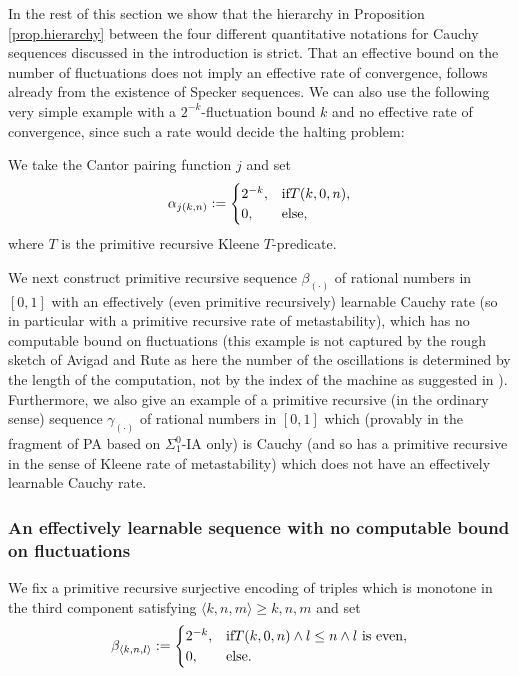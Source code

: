 In the rest of this section we show that the hierarchy in Proposition \ref{prop.hierarchy} 
between the four different 
quantitative notations for Cauchy sequences discussed in the introduction 
is strict. That an effective bound on the number of fluctuations does not imply an 
effective rate of convergence, follows already from the existence of Specker sequences. We can also use the following
very simple example with a $2^{-k}$-fluctuation bound $k$ and no effective rate of convergence, since such a rate would decide the halting problem:\\ 
\begin{dfn}[$\alpha_{(\cdot)}$] 
We take the Cantor pairing function $j$ and set
\[
\alpha_{j(k,n)}:=
\begin{cases}
2^{-k}, &\text{if} T(k,0,n),\\
0, &\text{else},
\end{cases}
\]
where $T$ is the primitive recursive Kleene $T$-predicate.
\end{dfn}
We next construct primitive recursive sequence $\beta_{(\cdot)}$ of rational 
numbers in $[0,1]$ with an effectively (even primitive recursively) learnable Cauchy rate (so in particular with a primitive recursive rate of metastability), which has no computable bound on fluctuations (this example is not captured by the rough sketch of Avigad and Rute as here the number of the oscillations is determined by the length of the computation, not by the index of the machine as suggested in \cite{Avigad/Rute}). 
Furthermore, we also give an example of a primitive recursive (in the ordinary 
sense) sequence $\gamma_{(\cdot)}$ of rational numbers in $[0,1]$ 
which (provably in the fragment 
of PA based on $\Sigma^0_1$-IA only) is Cauchy (and so 
has a primitive recursive in the sense of Kleene rate of metastability) 
which does not have an effectively learnable Cauchy rate. 

\subsubsection*{An effectively learnable sequence with no computable bound on fluctuations}

\begin{dfn}[$\beta_{(\cdot)}$]\label{d:beta}
We fix a primitive recursive 
surjective encoding of triples which is monotone in the third component 
satisfying $\langle k,n,m\rangle\ge k,n,m$ and set
\[
\beta_{\langle k,n,l\rangle}:=
\begin{cases}
2^{-k}, &\text{if} T(k,0,n) \wedge l\leq n \wedge l\text{ is even},\\
0, &\text{else}.
\end{cases}
\]
\end{dfn}

